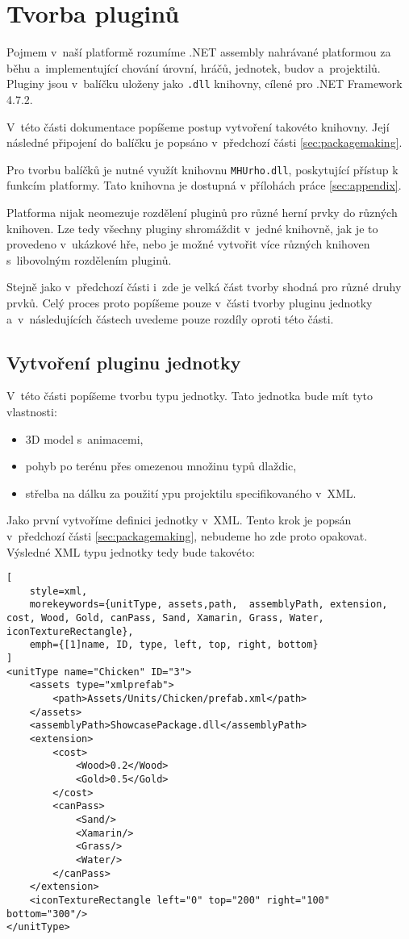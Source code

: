 \chapter{Tvorba pluginů}
\label{sec:pluginmaking}
Pojmem  v~naší platformě rozumíme .NET assembly nahrávané platformou za běhu a~implementující chování úrovní, hráčů, jednotek, budov a~projektilů. Pluginy jsou v~balíčku uloženy jako \texttt{.dll} knihovny, cílené pro .NET Framework 4.7.2. 

V~této části dokumentace popíšeme postup vytvoření takovéto knihovny. Její následné připojení do balíčku je popsáno v~předchozí části \ref{sec:packagemaking}.

Pro tvorbu balíčků je nutné využít knihovnu \texttt{MHUrho.dll}, poskytující přístup k funkcím platformy. Tato knihovna je dostupná v přílohách práce \ref{sec:appendix}.

Platforma nijak neomezuje rozdělení pluginů pro různé herní prvky do různých knihoven. Lze tedy všechny pluginy shromáždit v~jedné knihovně, jak je to provedeno v~ukázkové hře, nebo je možné vytvořit více různých knihoven s~libovolným rozdělením pluginů.

Stejně jako v~předchozí části i~zde je velká část tvorby shodná pro různé druhy prvků. Celý proces proto popíšeme pouze v~části tvorby pluginu jednotky a~v~následujících částech uvedeme pouze rozdíly oproti této části.


\section{Vytvoření pluginu jednotky}
\label{sec:unittypeplugin}
V~této části popíšeme tvorbu typu jednotky. Tato jednotka bude mít tyto vlastnosti:

\begin{itemize}
	\item 3D model s~animacemi,
	\item pohyb po terénu přes omezenou množinu typů dlaždic,
	\item střelba na dálku za použití ypu projektilu specifikovaného v~XML.
\end{itemize}

Jako první vytvoříme definici jednotky v~XML. Tento krok je popsán v~předchozí části \ref{sec:packagemaking}, nebudeme ho zde proto opakovat. Výsledné XML typu jednotky tedy bude takovéto:

\begin{lstlisting}[
	style=xml,
	morekeywords={unitType, assets,path,  assemblyPath, extension, cost, Wood, Gold, canPass, Sand, Xamarin, Grass, Water, iconTextureRectangle},
	emph={[1]name, ID, type, left, top, right, bottom}
]
<unitType name="Chicken" ID="3">
	<assets type="xmlprefab">
		<path>Assets/Units/Chicken/prefab.xml</path>
	</assets>
	<assemblyPath>ShowcasePackage.dll</assemblyPath>
	<extension>
		<cost>
			<Wood>0.2</Wood>
			<Gold>0.5</Gold>
		</cost>
		<canPass>
			<Sand/>
			<Xamarin/>
			<Grass/>
			<Water/>
		</canPass>
	</extension>
	<iconTextureRectangle left="0" top="200" right="100" bottom="300"/>
</unitType>
\end{lstlisting}

